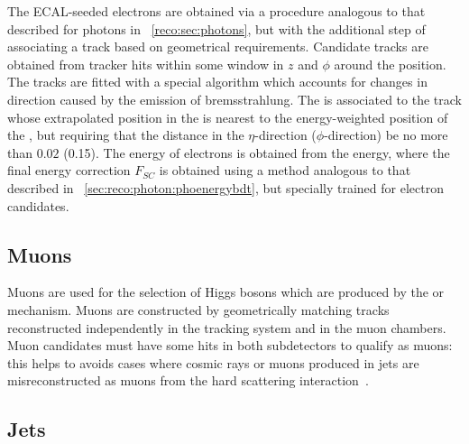 The ECAL-seeded electrons are obtained via a procedure analogous to that described for photons in \Sec~\ref{reco:sec:photons}, but with the additional step of associating a track based on geometrical requirements. Candidate tracks are obtained from tracker hits within some window in $z$ and $\phi$ around the \SC position. The tracks are fitted with a special algorithm which accounts for changes in direction caused by the emission of bremsstrahlung. The \SC is associated to the track whose extrapolated position in the \ECAL is nearest to the energy-weighted position of the \SC, but requiring that the distance in the $\eta$-direction ($\phi$-direction) be no more than $0.02$ (0.15). The energy of electrons is obtained from the \SC energy, where the final energy correction $F_{SC}$ is obtained using a \BDT method analogous to that described in \Sec~\ref{sec:reco:photon:phoenergybdt}, but specially trained for electron candidates.

\subsection{Muons}

Muons are used for the selection of Higgs bosons which are produced by the \ZH or \WH mechanism. Muons are constructed by geometrically matching tracks reconstructed independently in the tracking system and in the muon chambers. Muon candidates must have some hits in both subdetectors to qualify as \PF muons: this helps to avoids cases where cosmic rays or muons produced in jets are misreconstructed as muons from the hard scattering interaction~\cite{MuonReco}.  

\subsection{Jets}
\label{reco:sec:jets}

